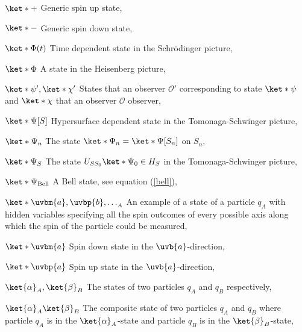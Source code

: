 \begin{thenomenclature}
      \item [{$\ket*{+}$}]\begingroup Generic spin up state, \nomrefpage{}
      \item [{$\ket*{-}$}]\begingroup Generic spin down state, \nomrefpage{}
      \item [{$\ket*{\Phi(t)}$}]\begingroup Time dependent state in the Schr\"{o}dinger picture, \nomrefpage{}
      \item [{$\ket*{\Phi}$}]\begingroup A state in the Heisenberg picture, \nomrefpage{}
      \item [{$\ket*{\psi'}, \ket*{\chi'}$}]\begingroup States that an observer $\mathcal{O}'$ corresponding to state $\ket*{\psi}$ and $\ket*{\chi}$ that an observer $\mathcal{O}$ observer, \nomrefpage{}
      \item [{$\ket*{\Psi[S]}$}]\begingroup Hypersurface dependent state in the Tomonaga-Schwinger picture, \nomrefpage{}
      \item [{$\ket*{\Psi_n}$}]\begingroup The state $\ket*{\Psi_n}=\ket*{\Psi[S_n]}$ on $S_n$, \nomrefpage{}
      \item [{$\ket*{\Psi_S}$}]\begingroup The state $U_{SS_0}\ket*{\Psi_0}\in H_S$ in the Tomonaga-Schwinger picture, \nomrefpage{}
      \item [{$\ket*{\Psi_{\text{Bell}}}$}]\begingroup A Bell state, see equation (\ref{bell}), \nomrefpage{}
      \item [{$\ket*{\uvbm{a},\uvbp{b},\ldots}_A$}]\begingroup An example of a state of a particle $q_A$ with hidden variables specifying all the spin outcomes of every possible axis along which the spin of the particle could be measured, \nomrefpage{}
      \item [{$\ket*{\uvbm{a}}$}]\begingroup Spin down state in the $\uvb{a}$-direction, \nomrefpage{}
      \item [{$\ket*{\uvbp{a}}$}]\begingroup Spin up state in the $\uvb{a}$-direction, \nomrefpage{}
      \item [{$\ket{\alpha}_A, \ket{\beta}_B$}]\begingroup The states of two particles $q_A$ and $q_B$ respectively, \nomrefpage{}
      \item [{$\ket{\alpha}_A\ket{\beta}_B$}]\begingroup The composite state of two particles $q_A$ and $q_B$ where particle $q_A$ is in the $\ket{\alpha}_A$-state and particle $q_B$ is in the $\ket{\beta}_B$-state, \nomrefpage{}

\end{thenomenclature}
